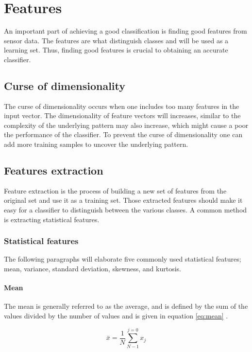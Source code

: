 \documentclass[USenglish]{ifimaster}  %
\begin{document}
\section{Features} \label{features}
An important part of achieving a good classification is finding good features from sensor data. The features are what distinguish classes and will be used as a learning set. Thus, finding good features is crucial to obtaining an accurate classifier.
	
\subsection{Curse of dimensionality}\label{curseDim}
The curse of dimensionality occurs when one includes too many features in the input vector. The dimensionality of feature vectors will increases, similar to the complexity of the underlying pattern may also increase, which might cause a poor the performance of the classifier. To prevent the curse of dimensionality one can add more training samples to uncover the underlying pattern.

	
\subsection{Features extraction} \label{feature_extraction}
Feature extraction is the process of building a new set of features from the original set and use it as a training set. Those extracted features should make it easy for a classifier to distinguish between the various classes. A common method is extracting statistical features.

\subsubsection{Statistical features} \label{sub:statical}
The following paragraphs will elaborate five commonly used statistical features; mean, variance, standard deviation, skewness, and kurtosis.
	
\paragraph{Mean}
The mean is generally referred to as the average, and is defined by the sum of the values divided by the number of values and is given in equation \ref{eq:mean} \cite{Press:2007:NRE:1403886}.
	
\begin{equation}
\bar{x} = \frac{1}{N}\sum_{N-1}^{j=0}x_{j}
\label{eq:mean}
\end{equation}
	
\end{document}
